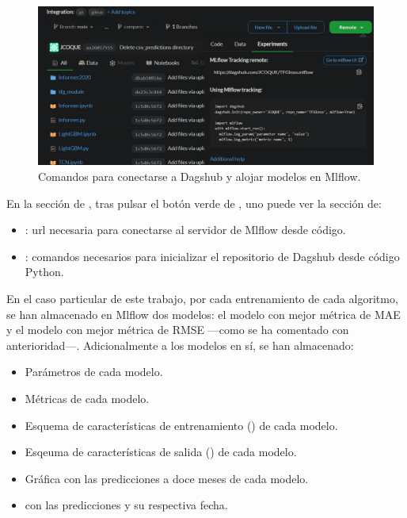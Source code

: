 \begin{figure}[H]
    \centering
    \includegraphics[scale = 0.6]{imgs/dagshub2.png}
    \caption[Comandos para  conectarse a Dagshub y alojar modelos en Mlflow]{Comandos para  conectarse a Dagshub y alojar modelos en Mlflow\protect\fnm.}
    \label{DasghubConnect}
\end{figure}


En la sección de , tras pulsar el botón verde de , uno puede ver la sección de:

\begin{itemize}
	\item {}: url necesaria para conectarse al servidor de Mlflow desde código.
	\item {}: comandos necesarios para inicializar el repositorio de Dagshub desde código Python.
\end{itemize}


En el caso particular de este trabajo, por cada entrenamiento de cada algoritmo, se han almacenado en Mlflow dos modelos: el modelo con mejor métrica de MAE y el modelo con mejor métrica de RMSE ---como se ha comentado con anterioridad---. Adicionalmente a los modelos en sí, se han almacenado:
\begin{itemize}
	\item Parámetros de cada modelo.
	\item Métricas de cada modelo.
	\item Esquema de características de entrenamiento () de cada modelo.
	\item Esqeuma de características de salida () de cada modelo.
	\item Gráfica con las predicciones a doce meses de cada modelo.
	\item {} con las predicciones y su respectiva fecha.
\end{itemize}

